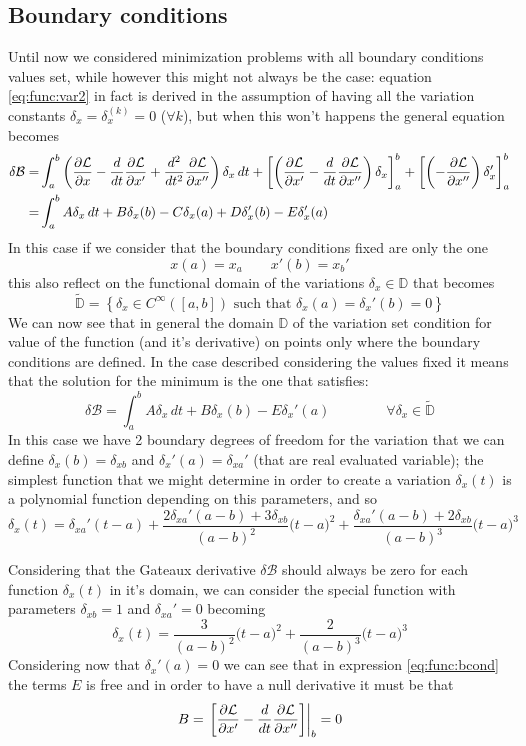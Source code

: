 \subsection{Boundary conditions} 
	Until now we considered minimization problems with all boundary conditions values set, while however this might not always be the case: equation \ref{eq:func:var2} in fact is derived in the assumption of having all the variation constants $\delta_x = \delta_x^{(k)} = 0$ ($\forall k$), but when this won't happens the general equation becomes
	\begin{align*}
		\delta \mathcal B=& \int_a^b \left( \frac{\partial \mathcal L}{\partial x} - \frac d{dt}\frac{\partial \mathcal L}{\partial x'} + \frac{d^2}{dt^2}\frac{\partial \mathcal L}{\partial x''} \right) \delta_x\, dt + \left[ \left( \frac{\partial \mathcal L}{\partial x'} - \frac d{dt} \frac{\partial \mathcal L}{\partial x''} \right) \delta_x \right]_a^b + \left[ \left(-\frac{\partial \mathcal L}{\partial x''} \right) \delta_x' \right]_a^b \\
		= & \int_a^b A\delta_x\, dt + B \delta_x(b) - C\delta_x(a) + D \delta_x'(b) - E \delta_x'(a)
	\end{align*}
	In this case if we consider that the boundary conditions fixed are only the one
	\[ x(a) = x_a \qquad x'(b) = x_b' \]
	this also reflect on the functional domain of the variations $\delta_x\in \mathds D$ that becomes
	\[ \tilde {\mathds D} = \left\{ \delta_x\in C^{\infty}([a,b]) \textrm{ such that } \delta_x(a) = \delta_x'(b) = 0 \right\} \]
	We can now see that in general the domain $\mathds D$ of the variation set condition for value of the function (and it's derivative) on points only where the boundary conditions are defined. In the case described considering the values fixed it means that the solution for the minimum is the one that satisfies:
	\begin{equation} \label{eq:func:bcond}
		\delta\mathcal B = \int_a^b A \delta_x\, dt + B \delta_x(b) - E\delta_x'(a)  \qquad \qquad \forall \delta_x \in \tilde{\mathds D}
	\end{equation}
	In this case we have 2 boundary degrees of freedom for the variation that we can define $\delta_x(b) = \delta_{xb}$ and $\delta_{x}'(a) = \delta_{xa}'$ (that are real evaluated variable); the simplest function that we might determine in order to create a variation $\delta_x(t)$ is a polynomial function depending on this parameters, and so
	\[ \delta_x(t) = \delta_{xa}' (t-a) + \frac{ 2\delta_{xa}'(a-b) + 3 \delta_{xb}  }{(a-b)^2} \big( t-a \big)^2 + \frac{ \delta_{xa}'(a-b) + 2 \delta_{xb} }{(a-b)^3} \big(t-a\big)^3  \]
	
	Considering that the Gateaux derivative $\delta \mathcal B$ should always be zero for each function $\delta_x(t)$ in it's domain, we can consider the special function with parameters  $\delta_{xb} = 1$ and $\delta_{xa}' = 0$ becoming
	\[ \delta_x(t) = \frac 3{(a-b)^2}\big(t-a\big)^2 + \frac 2{(a-b)^3} \big(t-a\big)^3\]
	Considering now that $\delta_x'(a) = 0$ we can see that in expression \ref{eq:func:bcond} the terms $E$ is free and in order to have a null derivative it must be that 
	\[ B = \left. \left[ \frac{\partial \mathcal L}{\partial x'} - \frac d {dt} \frac{\partial \mathcal L}{\partial x''} \right] \right|_b = 0 \]
	
